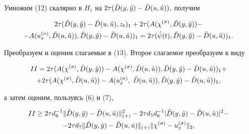 %


Умножим (12) скалярно в $H_1$ на $2\tau(\Tilde D(y,\Hat y)- 


\Tilde D(u,\Hat u)),$ получим 


\begin{multline} 


2\tau(\Tilde D(y,\Hat y)-\Tilde D(u,\Hat u),z_t)_1+2\tau 


(A(\chi^{(\sigma)},\Tilde D(y,\Hat y))- \\ 


-A(u_x^{(\sigma)}, \Tilde D(u,\Hat u)), 


\Tilde D(y,\Hat y)-\Tilde D(u,\Hat u))_1= 


2\tau (\Hat \psi(t), \Tilde D(y,\Hat y)-\Tilde D(u,\Hat u))_1. 


\end{multline} 


%


Преобразуем и оценим слагаемые в (13). Второе слагаемое преобразуем к виду 


\begin{multline*} 


II=2\tau(A(\chi^{(\sigma)},\Tilde D(y,\Hat y)) - 


A(\chi^{(\sigma)},\Tilde D(u,\Hat u)), 


\Tilde D(y,\Hat y)-\Tilde D(u,\Hat u))_1+ \\ 


+2\tau(A(\chi^{(\sigma)},\Tilde D(u,\Hat u))- 


A(u_x^{(\sigma)},\;\Tilde D(u,\Hat u)), 


\Tilde D(y,\Hat y)-\Tilde D(u,\Hat u))_1, 


\end{multline*} 


а затем оценим, пользуясь (6) и (7), 


\begin{multline*} 


II\ge 2 \tau d_6^{-1} 


\|\Tilde D(y,\Hat y)-\Tilde D(u,\Hat u)\|^2_{(+)}- 


2 \tau d_5 d_6^{-1} 


|\Tilde D(y,\Hat y)-\Tilde D(u,\Hat u)|^2- \\


-2 \tau d_7\|\Tilde D(y,\Hat y)-\Tilde D(u,\Hat u)\|_{(+)} 


\|\chi^{(\sigma)}-u_x^{(\sigma)}\|_2, 


\end{multline*} 


